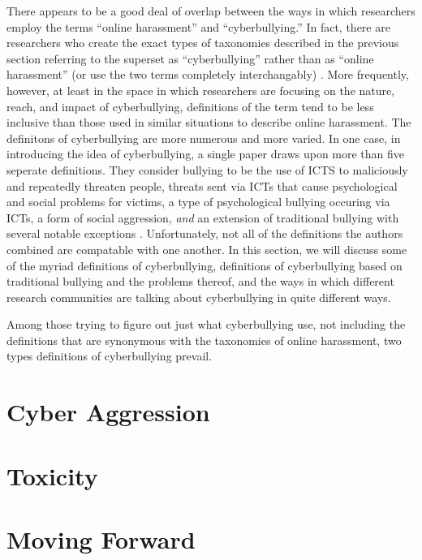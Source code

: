 \documentclass{sigchi}
\begin{document}
There appears to be a good deal of overlap between the ways in which researchers employ the terms ``online harassment'' and ``cyberbullying.''  In fact, there are researchers who create the exact types of taxonomies described in the previous section referring to the superset as ``cyberbullying'' rather than as ``online harassment'' (or use the two terms completely interchangably) \cite{Lenhart2007Cyberbullying}.  More frequently, however, at least in the space in which researchers are focusing on the nature, reach, and impact of cyberbullying, definitions of the term tend to be less inclusive than those used in similar situations to describe online harassment.  The definitons of cyberbullying are more numerous and more varied.  In one case, in introducing the idea of cyberbullying, a single paper draws upon more than five seperate definitions.  They consider bullying to be the use of ICTS to maliciously and repeatedly threaten people, threats sent via ICTs that cause psychological and social problems for victims, a type of psychological bullying occuring via ICTs, a form of social aggression, \textit{and} an extension of traditional bullying with several notable exceptions \cite{Cetin2011Cyber}.  Unfortunately, not all of the definitions the authors combined are compatable with one another.  In this section, we will discuss some of the myriad definitions of cyberbullying, definitions of cyberbullying based on traditional bullying and the problems thereof, and the ways in which different research communities are talking about cyberbullying in quite different ways.

Among those trying to figure out just what cyberbullying use, not including the definitions that are synonymous with the taxonomies of online harassment, two types definitions of cyberbullying prevail.



\section{Cyber Aggression}

\section{Toxicity}

\section{Moving Forward}

\balance{}



\end{document}
